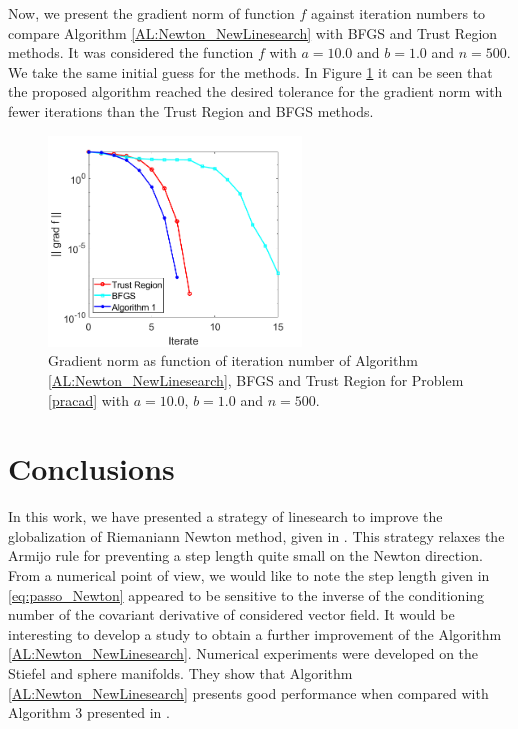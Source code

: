 Now, we present the gradient norm of function $f$ against iteration numbers to compare Algorithm \ref{AL:Newton_NewLinesearch} with BFGS and Trust Region methods. It was considered the function $f$ with $a=10.0$ and $b=1.0$ and $n=500$. We take the same  initial guess for the methods. In Figure \ref{fig:logdetiter} it can be seen that the proposed algorithm reached the desired tolerance for the gradient norm with fewer iterations than the Trust Region and BFGS methods.
\begin{figure}
	\centering
	\includegraphics[width=0.6\textwidth]{logdet_iter.png}
	\caption{Gradient norm as function of iteration number of Algorithm \ref{AL:Newton_NewLinesearch}, BFGS and Trust Region for Problem \ref{pracad} with $a=10.0$, $b=1.0$ and $n=500$.}
	\label{fig:logdetiter}
\end{figure}


\section{ Conclusions} \label{sec:conclusions}
In this work, we have presented a strategy of linesearch to improve the globalization of Riemaniann Newton method, given in \cite{bortoloti2022efficient}.
This strategy relaxes the Armijo rule for preventing a step length quite small on the Newton direction.
From a numerical point of view, we would like to note the step length given in \eqref{eq:passo_Newton} appeared to be sensitive to the inverse of the conditioning number of the covariant derivative of considered vector field. It would be interesting to develop a study to obtain a further improvement of the Algorithm \ref{AL:Newton_NewLinesearch}.
Numerical experiments were developed on the Stiefel and sphere manifolds. They show that Algorithm \ref{AL:Newton_NewLinesearch} presents good performance when compared with Algorithm 3 presented in \cite{bortoloti2022efficient}.


